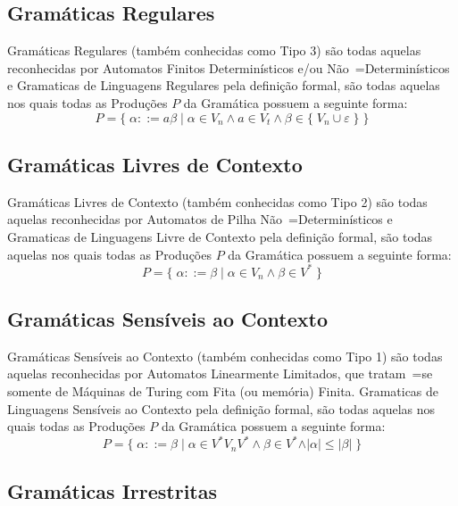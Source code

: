 {\subsection*{Gramáticas Regulares}

    Gramáticas Regulares (também conhecidas como Tipo 3) são todas aquelas reconhecidas
    por Automatos Finitos Determinísticos e\slash{}ou Não~=Determinísticos e
    Gramaticas de Linguagens Regulares pela definição formal,
    são todas aquelas nos quais todas as Produções $P$ da Gramática possuem a seguinte forma:
    $$ P = \{\; \alpha ::= a \beta \;|\; \alpha \in V_n \land a \in V_t
                \land \beta \in \{\; V_n \cup \varepsilon\; \} \;\} $$

\subsection*{Gramáticas Livres de Contexto}

    Gramáticas Livres de Contexto (também conhecidas como Tipo 2) são todas
    aquelas reconhecidas por Automatos de Pilha Não~=Determinísticos e
    Gramaticas de Linguagens Livre de Contexto pela definição formal,
    são todas aquelas nos quais todas as Produções $P$ da Gramática possuem a seguinte forma:
    $$ P = \{\; \alpha ::= \beta \;|\; \alpha \in V_n \land \beta \in V^* \;\} $$


\subsection*{Gramáticas Sensíveis ao Contexto}

    Gramáticas Sensíveis ao Contexto (também conhecidas como Tipo 1) são
    todas aquelas reconhecidas por Automatos Linearmente Limitados,
    que tratam~=se somente de Máquinas de Turing
    \cite{turingMachinesFunctions} com Fita (ou memória) Finita.
    Gramaticas de Linguagens Sensíveis ao Contexto pela definição formal,
    são todas aquelas nos quais todas as Produções $P$ da Gramática possuem a seguinte forma:
    $$ P = \{\; \alpha ::= \beta \;|\; \alpha \in V^* V_n V^* \land \beta \in V^*
                \land \vert\alpha\vert \leq \vert\beta\vert \;\} $$


\subsection*{Gramáticas Irrestritas}

}
